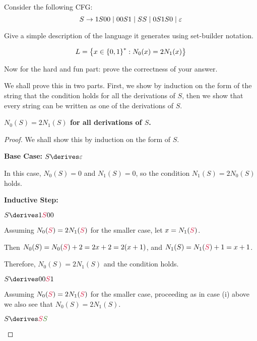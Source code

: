 \begin{problem}
  Consider the following CFG:
  \[
    S \to 1S00 \mid 00S1 \mid SS \mid 0S1S0 \mid \varepsilon
  \]
  \begin{enumalph}
    \item Give a simple description of the language it generates
      using set-builder notation.
      \begin{Answer}
        \[
          L = \left\{x \in \left\{0, 1\right\}^* : N_0(x) = 2N_1(x)\right\}
        \]
      \end{Answer}
    \item Now for the hard and fun part: prove the correctness
      of your answer.
      \begin{Answer}
        We shall prove this in two parts. First, we show by induction on the form
        of the string that the condition holds for all the derivations of $S$,
        then we show that every string can be written as one of the derivations of $S$.

        \step
        \begin{claim}
          \textbf{$N_0(S) = 2N_1(S)$ for all derivations of $S$.}
          \begin{proof}
            We shall show this by induction on the form of $S$.

            \step
            \textbf{Base Case:} $S \derives \eps$
              
            \step
            In this case, $N_0(S) = 0$ and $N_1(S) = 0$,
            so the condition $N_1(S) = 2N_0(S)$ holds.

            \step
            \textbf{Inductive Step:}
            \begin{enumroman}
              \item $S \derives 1\crim{S}00$

                \step
                Assuming $N_0(\crim{S}) = 2N_1(\crim{S})$ for the smaller case,
                let $x = N_1(\crim{S})$.

                \step
                Then $N_0(S) = N_0(\crim{S}) + 2 = 2x + 2 = 2(x + 1)$,
                and $N_1(S) = N_1(\crim{S}) + 1 = x + 1$.

                \step
                Therefore, $N_0(S) = 2N_1(S)$ and the condition holds.
              \item $S \derives 00\crim{S}1$
              
                \step
                Assuming $N_0(\crim{S}) = 2N_1(\crim{S})$ for the smaller case,
                proceeding as in case (i) above we also see that $N_0(S) = 2N_1(S)$.
              \item $S \derives \crim{S}\green{S}$
                

\end{enumroman}
\end{proof}
\end{claim}
\end{Answer}
\end{enumalph}
\end{problem}
